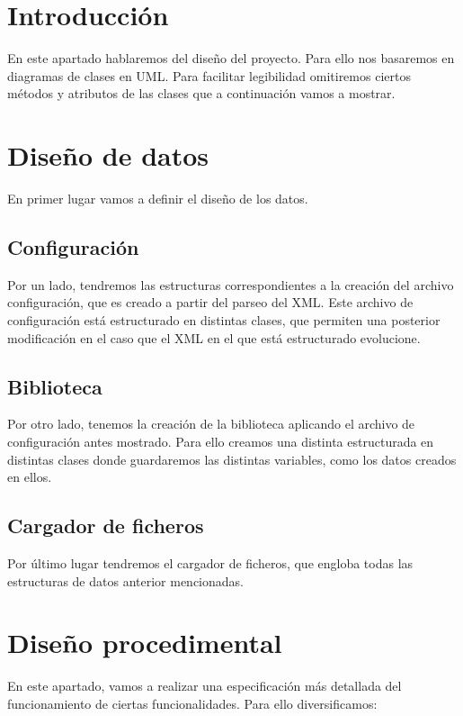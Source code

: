 
\section{Introducción}
En este apartado hablaremos del diseño del proyecto. Para ello nos basaremos en diagramas de clases en UML. Para facilitar legibilidad omitiremos ciertos métodos y atributos de las clases que a continuación vamos a mostrar.
\section{Diseño de datos}
En primer lugar vamos a definir el diseño de los datos.
\subsection{Configuración}
Por un lado, tendremos las estructuras correspondientes a la creación del archivo configuración, que es creado a partir del parseo del XML. Este archivo de configuración está estructurado en distintas clases, que permiten una posterior modificación en el caso que el XML en el que está estructurado evolucione.

\subsection{Biblioteca}

Por otro lado, tenemos la creación de la biblioteca aplicando el archivo de configuración antes mostrado. Para ello creamos una distinta estructurada en distintas clases donde guardaremos las distintas variables, como los datos creados en ellos.



\subsection{Cargador de ficheros}

Por último lugar tendremos el cargador de ficheros, que engloba todas las estructuras de datos anterior mencionadas.


\section{Diseño procedimental}
En este apartado, vamos a realizar una especificación más detallada del funcionamiento de ciertas funcionalidades.
Para ello diversificamos:

